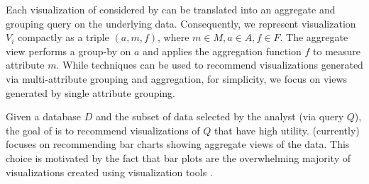 Each visualization of considered by \SeeDB can be translated into an aggregate
and grouping query on the underlying data.
Consequently, we represent visualization $V_i$ compactly as a triple $(a, m, f)$, 
where $m \in M, a \in A, f \in F$.   
The aggregate view performs a group-by on $a$ and applies the aggregation function $f$ 
to measure attribute $m$. 
While \SeeDB techniques can be used to recommend visualizations
generated via multi-attribute grouping and aggregation,
for simplicity, we focus on views generated by single attribute grouping. 






Given a database $D$ and the subset of data selected by the analyst (via query $Q$), 
the goal of \SeeDB is to recommend visualizations of $Q$ that have high utility. 
\SeeDB (currently) focuses on recommending bar charts showing aggregate views of the 
data.
This choice is motivated by the fact that bar plots are the overwhelming
majority of visualizations created using visualization tools 
\cite{DBLP:journals/sigmod_record/MortonBGKM14}.
\fi





